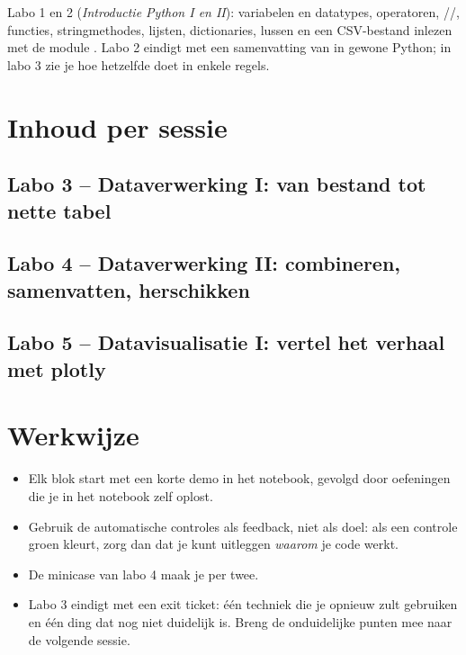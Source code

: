 \documentclass[11pt,a4paper]{article}
\begin{document}
Labo 1 en 2 (\emph{Introductie Python I en II}): variabelen en datatypes,
operatoren, //, functies,
stringmethodes, lijsten, dictionaries, lussen en een CSV-bestand inlezen
met de module . Labo 2 eindigt met een samenvatting van
 in gewone Python; in labo 3 zie je hoe 
hetzelfde doet in enkele regels.





\section{Inhoud per sessie}

\subsection{Labo 3 -- Dataverwerking I: van bestand tot nette tabel}


\subsection{Labo 4 -- Dataverwerking II: combineren, samenvatten, herschikken}


\subsection{Labo 5 -- Datavisualisatie I: vertel het verhaal met plotly}


\section{Werkwijze}

\begin{itemize}
  \item Elk blok start met een korte demo in het notebook, gevolgd door
        oefeningen die je in het notebook zelf oplost.
  \item Gebruik de automatische controles als feedback, niet als doel:
        als een controle groen kleurt, zorg dan dat je kunt uitleggen
        \emph{waarom} je code werkt.
  \item De minicase van labo 4 maak je per twee.
  \item Labo 3 eindigt met een exit ticket: één techniek die je opnieuw
        zult gebruiken en één ding dat nog niet duidelijk is. Breng de
        onduidelijke punten mee naar de volgende sessie.
\end{itemize}
\end{document}
